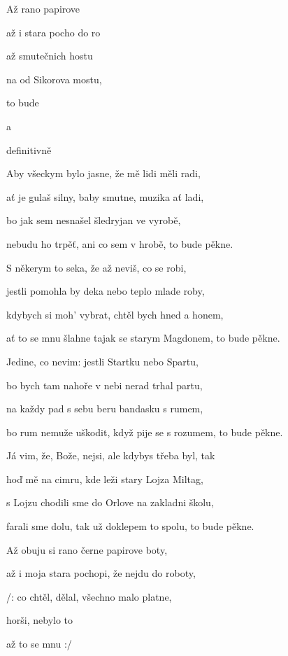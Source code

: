 


\zs
Až  rano  papirove 

až i  stara pocho do ro

až  smutečnich hostu

na  od Sikorova mostu,

 to bude 
\ks

\zr
{} a 

 definitivně    
\kr

\zs
Aby všeckym bylo jasne, že mě lidi měli radi,

ať je gulaš silny, baby smutne, muzika ať ladi,

bo jak sem nesnašel šledryjan ve vyrobě,

nebudu ho trpěť, ani co sem v hrobě, to bude pěkne.
\ks

\zr\kr

\zs
S někerym to seka, že až neviš, co se robi,

jestli pomohla by deka nebo teplo mlade roby,

kdybych si moh' vybrat, chtěl bych hned a honem,

ať to se mnu šlahne tajak se starym Magdonem, to bude pěkne.
\ks

\zr\kr

\zs
Jedine, co nevim: jestli Startku nebo Spartu,

bo bych tam nahoře v nebi nerad trhal partu,

na každy pad s sebu beru bandasku s rumem,

bo rum nemuže uškodit, když pije se s rozumem, to bude pěkne.
\ks

\zr\kr

\zs
Já vim, že, Bože, nejsi, ale kdybys třeba byl, tak

hoď mě na cimru, kde leži stary Lojza Miltag,

s Lojzu chodili sme do Orlove na zakladni školu,

farali sme dolu, tak už doklepem to spolu, to bude pěkne.
\ks

\zr\kr

\zs
Až obuju si rano černe papirove boty,

až i moja stara pochopi, že nejdu do roboty,

/:  co chtěl, dělal, všechno malo platne,

 horši, nebylo to 

až to se mnu  :/
\ks

  
    

\kp
